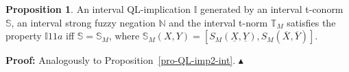\documentclass[conference]{IEEEtran}
\theoremstyle{plain}
\theoremstyle{remark}
\theoremstyle{definition}
\newtheorem{definition}[theorem]{Definition}
\theoremstyle{proposition}
\newtheorem{proposition}[theorem]{Proposition}
\newcommand{\II}{\mathbb{I} }
\newcommand{\NN}{\mathbb{N} }
\newcommand{\TT}{\mathbb{T} }
\newcommand{\Ss}{\mathbb{S} }
\newcommand{\prova}[1]{\noindent\textbf{Proof:} #1\hfill
{\small $\blacktriangle$}\\}
\begin{document}


\begin{proposition}\label{pro-QL-imp3-int}
An interval QL-implication $\II$ generated by an interval t-conorm
$\Ss$, an interval strong fuzzy negation $\NN$ and the interval
t-norm $\TT_M$ satisfies the property $\II 11a$ iff $\Ss=\Ss_M$,
where $\Ss_M(X,Y)= [S_M(\underline{X}, \underline{Y}),
S_M(\overline{X}, \overline{Y})]$.
\end{proposition}
\prova{Analogously to Proposition~\ref{pro-QL-imp2-int}.}



\end{document}
